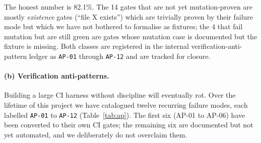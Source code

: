 \documentclass[11pt,twocolumn]{article}
\begin{document}
The honest number is 82.1\%. The 14 gates that are not yet
mutation-proven are mostly \emph{existence} gates (``file X exists'')
which are trivially proven by their failure mode but which we have
not bothered to formalise as fixtures; the 4 that fail mutation but
are still green are gates whose mutation case is documented but the
fixture is missing. Both classes are registered in the internal
verification-anti-pattern ledger as \texttt{AP-01} through
\texttt{AP-12} and are tracked for closure.

\paragraph{(b) Verification anti-patterns.}
Building a large CI harness without discipline will eventually rot.
Over the lifetime of this project we have catalogued twelve recurring
failure modes, each labelled \texttt{AP-01} to \texttt{AP-12}
(Table~\ref{tab:ap}). The first six (AP-01 to AP-06) have been
converted to their own CI gates; the remaining six are documented but
not yet automated, and we deliberately do not overclaim them.
\end{document}
